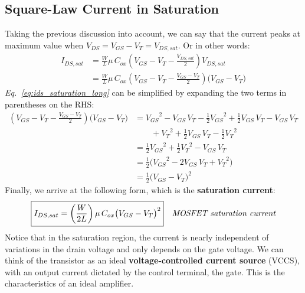 \subsection{Square-Law Current in Saturation}
Taking the previous discussion into account, we can say that the current peaks at maximum value when 
$V_{DS} = V_{GS} - V_{T} = V_{DS,sat}$.  Or in other words:
    \begin{align}
        I_{DS,sat} &= \frac{W}{L}\mu\,C_{ox}\left(V_{GS} - V_T - \frac{V_{DS,sat}}{2}\right)V_{DS,sat}\\[0.25cm]
        &= \frac{W}{L}\mu\,C_{ox}\left(V_{GS} - V_T - \frac{V_{GS} - V_T}{2}\right) \big(V_{GS} - V_T\big)
        \label{eq:ids_saturation_long}
    \end{align}
\vspace{0.25cm}
\emph{Eq.~\ref{eq:ids_saturation_long}} can be simplified by expanding the two terms in parentheses on the RHS:
    \begin{align*}
        \left(V_{GS} - V_T - \frac{V_{GS} - V_T}{2}\right) \big(V_{GS} - V_T\big)
        &= {V_{GS}}^2 - V_{GS}\,V_T - \frac{1}{2}{V_{GS}}^2 + \frac{1}{2}V_{GS}\,V_T - V_{GS}\,V_T\\[0.15cm]
        &\qquad + {V_T}^2 + \frac{1}{2}V_{GS}\,V_T - \frac{1}{2}{V_T}^2\\[0.45cm]
        &=\frac{1}{2}{V_{GS}}^2 + \frac{1}{2}{V_T}^2 - V_{GS}\,V_T\\[0.45cm]
        &=\frac{1}{2}\big( {V_{GS}}^2 - 2V_{GS}\,V_T + {V_T}^2 \big)\\[0.45cm]
        &=\frac{1}{2} {\big(V_{GS} - V_T\big)}^2
    \end{align*}
Finally, we arrive at the following form, which is the \textbf{saturation current}:
    \begin{align}
        \Aboxed{I_{DS,sat} = \left(\frac{W}{2L}\right) \mu\,C_{ox} {\big(V_{GS} - V_T\big)}^2}
        &\textit{MOSFET saturation current}
        \label{eq:ids_saturation}
    \end{align}
Notice that in the saturation region, the current is nearly independent of variations in the drain voltage and only depends on the gate voltage.  We can think of the transistor as an ideal \textbf{voltage-controlled current source} (VCCS), with an output current dictated by the control terminal, the gate.  This is the characteristics of an ideal amplifier.
